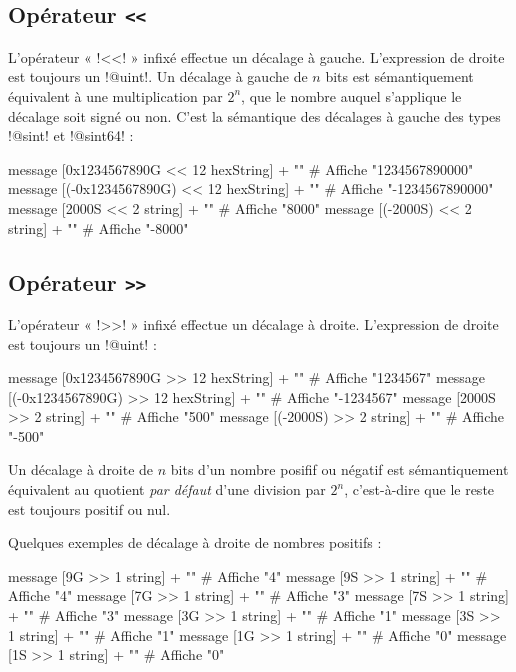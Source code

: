 \subsection{Opérateur \texttt{<{}<}}

L'opérateur « \ggs!<<! » infixé effectue un décalage à gauche. L'expression de droite est toujours un \ggs!@uint!. Un décalage à gauche de $n$ bits est sémantiquement équivalent à une multiplication par $2^n$, que le nombre auquel s'applique le décalage soit signé ou non. C'est la sémantique des décalages à gauche des types \ggs!@sint! et \ggs!@sint64! :

\begin{galgas}
  message [0x1234567890G << 12 hexString] + "\n" # Affiche "1234567890000"
  message [(-0x1234567890G) << 12 hexString] + "\n" # Affiche "-1234567890000"
  message [2000S << 2 string] + "\n" # Affiche "8000"
  message [(-2000S) << 2 string] + "\n" # Affiche "-8000"
\end{galgas}

\subsection{Opérateur \texttt{>{}>}}

L'opérateur « \ggs!>>! » infixé effectue un décalage à droite. L'expression de droite est toujours un \ggs!@uint! :
\begin{galgas}
  message [0x1234567890G >> 12 hexString] + "\n" # Affiche "1234567"
  message [(-0x1234567890G) >> 12 hexString] + "\n" # Affiche "-1234567"
  message [2000S >> 2 string] + "\n" # Affiche "500"
  message [(-2000S) >> 2 string] + "\n" # Affiche "-500"
\end{galgas}

Un décalage à droite de $n$ bits d'un nombre posifif ou négatif est sémantiquement équivalent au quotient \emph{par défaut} d'une division par $2^n$, c'est-à-dire que le reste est toujours positif ou nul.

Quelques exemples de décalage à droite de nombres positifs :

\begin{galgas}
  message [9G >> 1 string] + "\n" # Affiche "4"
  message [9S >> 1 string] + "\n" # Affiche "4"
  message [7G >> 1 string] + "\n" # Affiche "3"
  message [7S >> 1 string] + "\n" # Affiche "3"
  message [3G >> 1 string] + "\n" # Affiche "1"
  message [3S >> 1 string] + "\n" # Affiche "1"
  message [1G >> 1 string] + "\n" # Affiche "0"
  message [1S >> 1 string] + "\n" # Affiche "0"
\end{galgas}


